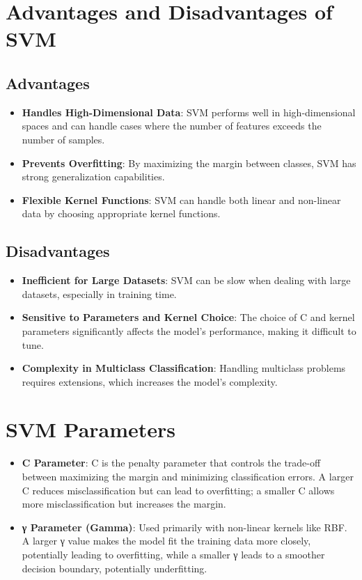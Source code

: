 \documentclass{article}
\begin{document}
	\section{Advantages and Disadvantages of SVM}
	
	\subsection{Advantages}
	
	\begin{itemize}
		\item \textbf{Handles High-Dimensional Data}: SVM performs well in high-dimensional spaces and can handle cases where the number of features exceeds the number of samples.
		\item \textbf{Prevents Overfitting}: By maximizing the margin between classes, SVM has strong generalization capabilities.
		\item \textbf{Flexible Kernel Functions}: SVM can handle both linear and non-linear data by choosing appropriate kernel functions.
	\end{itemize}
	
	\subsection{Disadvantages}
	
	\begin{itemize}
		\item \textbf{Inefficient for Large Datasets}: SVM can be slow when dealing with large datasets, especially in training time.
		\item \textbf{Sensitive to Parameters and Kernel Choice}: The choice of C and kernel parameters significantly affects the model's performance, making it difficult to tune.
		\item \textbf{Complexity in Multiclass Classification}: Handling multiclass problems requires extensions, which increases the model's complexity.
	\end{itemize}
	
	\section{SVM Parameters}
	
	\begin{itemize}
		\item \textbf{C Parameter}: C is the penalty parameter that controls the trade-off between maximizing the margin and minimizing classification errors. A larger C reduces misclassification but can lead to overfitting; a smaller C allows more misclassification but increases the margin.
		\item \textbf{γ Parameter (Gamma)}: Used primarily with non-linear kernels like RBF. A larger γ value makes the model fit the training data more closely, potentially leading to overfitting, while a smaller γ leads to a smoother decision boundary, potentially underfitting.
	\end{itemize}
	
\end{document}
